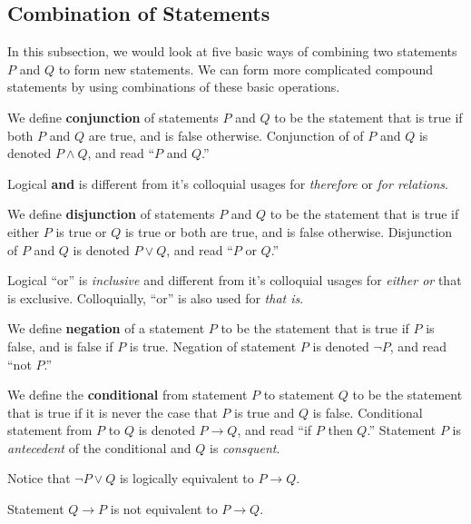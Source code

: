 \documentclass[]{article}
\begin{document}
\subsection{Combination of Statements }
In this subsection, we would look at five basic ways of combining two statements $P$ and $Q$ to form new statements. We can form more complicated compound statements by using combinations of these basic operations. 
\begin{defn}[Conjunction] We define \textbf{conjunction} of statements $P$ and $Q$ to be the statement that is true if both $P$ and $Q$ are true, and is false otherwise. Conjunction of of $P$ and $Q$ is denoted $P \wedge Q$, and read ``$P$ and $Q$.''
\end{defn}
\begin{rem} Logical \textbf{and} is different from it's colloquial usages for \emph{therefore} or \emph{for relations}.
\end{rem}	
\begin{defn}[Disjunction] We define \textbf{disjunction} of statements $P$ and $Q$ to be the statement that is true if either $P$ is true or $Q$ is true or both are true, and is false otherwise. Disjunction of $P$ and $Q$ is denoted $P \vee Q$, and read ``$P$ or $Q$.''
\end{defn}
\begin{rem} Logical ``or'' is \emph{inclusive} and different from it's colloquial usages for \emph{either or} that is exclusive. Colloquially, ``or'' is also used for \emph{that is}.
\end{rem}			
\begin{defn}[Negation] We define \textbf{negation} of a statement $P$ to be the statement that is true if $P$ is false, and is false if $P$ is true. Negation of statement $P$ is denoted $\neg P$, and read ``not $P$.''	
\end{defn}
\begin{defn}[Conditional] We define the \textbf{conditional} from statement $P$ to statement $Q$ to be the statement that is true if it is never the case that $P$ is true and $Q$ is false. Conditional statement from $P$ to $Q$ is denoted $P \rightarrow Q$, and read ``if $P$ then $Q$.''	Statement $P$ is \emph{antecedent} of the conditional and $Q$ is \emph{consquent}.	
\end{defn}
\begin{rem} Notice that $\neg P \vee Q$ is logically equivalent to $P \rightarrow Q$.
\end{rem}	
\begin{rem} Statement $Q \rightarrow P$ is not equivalent to $P \rightarrow Q$.
\end{rem}	
\end{document}
